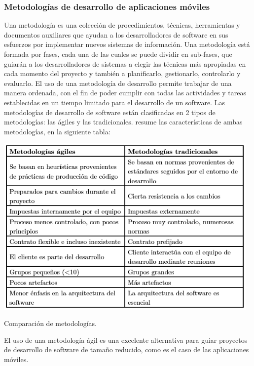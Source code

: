 \documentclass[12pt,letterpaper,openany]{book}
\begin{document}
\subsubsection{Metodologías de desarrollo de aplicaciones móviles}
Una metodología es una colección de procedimientos, técnicas, herramientas y documentos auxiliares que ayudan a los desarrolladores de software en sus esfuerzos por implementar nuevos sistemas de información. Una metodología está formada por fases, cada una de las cuales se puede dividir en sub-fases, que guiarán a los desarrolladores de sistemas a elegir las técnicas más apropiadas en cada momento del proyecto y también a planificarlo, gestionarlo, controlarlo y evaluarlo.
\vspace{5mm}\newline
El uso de una metodología de desarrollo permite trabajar de una manera ordenada, con el fin de poder cumplir con todas las actividades y tareas establecidas en un tiempo limitado para el desarrollo de un software. 
\vspace{5mm}\newline
Las metodologías de desarrollo de software están clasificadas en 2 tipos de metodologías: las ágiles y las tradicionales. \cite{12} resume las características de ambas metodologías, en la siguiente tabla:

\begin{table}[H]
\centering
\includegraphics[width=13cm]{./imagenes/tablas/comparacion_metodologias}
\caption{Comparación de metodologías. \cite{12}}
\end{table}

El uso de una metodología ágil es una excelente alternativa para guiar proyectos de desarrollo de software de tamaño reducido, como es el caso de las aplicaciones móviles. 
\end{document}

